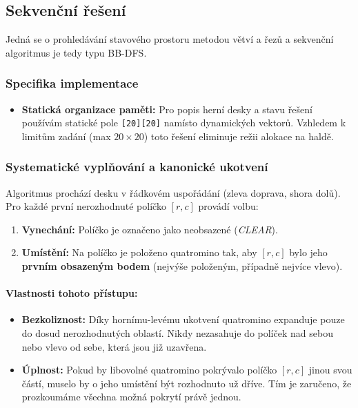 \documentclass[11pt,a4paper]{article}
\begin{document}
\subsection{Sekvenční řešení}

Jedná se o prohledávání stavového prostoru metodou větví a řezů a sekvenční algoritmus je tedy typu BB-DFS.

\subsubsection{Specifika implementace}
\begin{itemize}
    \item \textbf{Statická organizace paměti:} Pro popis herní desky a stavu řešení používám statické pole \texttt{[20][20]} namísto dynamických vektorů. Vzhledem k limitům zadání (max $20\times20$) toto řešení eliminuje režii alokace na haldě.
\end{itemize}

\subsubsection{Systematické vyplňování a kanonické ukotvení}
Algoritmus prochází desku v řádkovém uspořádání (zleva doprava, shora dolů). Pro každé první nerozhodnuté políčko $[r, c]$ provádí volbu:

\begin{enumerate}
    \item \textbf{Vynechání:} Políčko je označeno jako neobsazené (\textit{CLEAR}).
    \item \textbf{Umístění:} Na políčko je položeno quatromino tak, aby $[r, c]$ bylo jeho \textbf{prvním obsazeným bodem} (nejvýše položeným, případně nejvíce vlevo).
\end{enumerate}

\paragraph{Vlastnosti tohoto přístupu:}
\begin{itemize}
    \item \textbf{Bezkoliznost:} Díky hornímu-levému ukotvení quatromino expanduje pouze do dosud nerozhodnutých oblastí. Nikdy nezasahuje do políček nad sebou nebo vlevo od sebe, která jsou již uzavřena.
    \item \textbf{Úplnost:} Pokud by libovolné quatromino pokrývalo políčko $[r, c]$ jinou svou částí, muselo by o jeho umístění být rozhodnuto už dříve. Tím je zaručeno, že prozkoumáme všechna možná pokrytí právě jednou.
\end{itemize}
\end{document}
